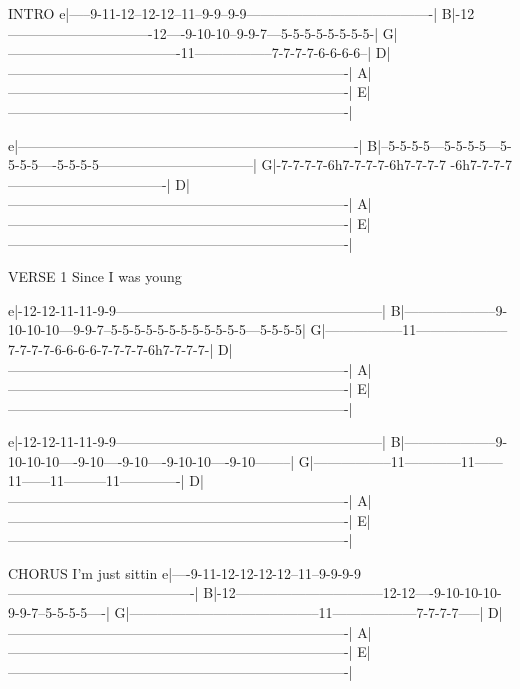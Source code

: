 INTRO
e|-----9-11-12--12-12--11--9-9--9-9----------------------------------------|
B|-12-------------------------------12----9-10-10--9-9-7---5-5-5-5-5-5-5-5-|
G|-------------------------------------11-----------------7-7-7-7-6-6-6-6--|
D|-------------------------------------------------------------------------|
A|-------------------------------------------------------------------------|
E|-------------------------------------------------------------------------|

e|-------------------------------------------------------------------------|
B|--5-5-5-5---5-5-5-5---5-5-5-5----5-5-5-5---------------------------------|
G|-7-7-7-7-6h7-7-7-7-6h7-7-7-7 -6h7-7-7-7----------------------------------|
D|-------------------------------------------------------------------------|
A|-------------------------------------------------------------------------|
E|-------------------------------------------------------------------------|


VERSE 1
Since I was young

e|-12-12-11-11-9-9---------------------------------------------------------|
B|--------------------9-10-10-10---9-9-7--5-5-5-5-5-5-5-5-5-5-5-5---5-5-5-5|
G|-----------------11--------------------7-7-7-7-6-6-6-6-7-7-7-7-6h7-7-7-7-|
D|-------------------------------------------------------------------------|
A|-------------------------------------------------------------------------|
E|-------------------------------------------------------------------------|

e|-12-12-11-11-9-9---------------------------------------------------------|
B|--------------------9-10-10-10----9-10----9-10----9-10-10----9-10--------|
G|-----------------11------------11------11------11---------11-------------|
D|-------------------------------------------------------------------------|
A|-------------------------------------------------------------------------|
E|-------------------------------------------------------------------------|


CHORUS
               I'm just sittin
e|----9-11-12-12-12-12--11--9-9-9-9----------------------------------------|
B|-12--------------------------------12-12----9-10-10-10-9-9-7--5-5-5-5----|
G|-----------------------------------------11------------------7-7-7-7-----|
D|-------------------------------------------------------------------------|
A|-------------------------------------------------------------------------|
E|-------------------------------------------------------------------------|

